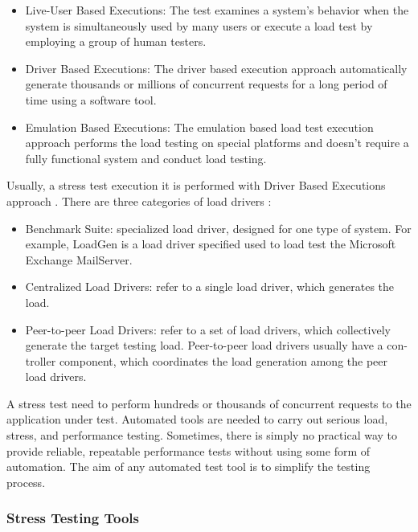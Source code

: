 \documentclass{report}
\begin{document}
\begin{itemize}
\item Live-User Based Executions: The test examines a system’s behavior when the system is simultaneously used by many users or execute a load test by employing a group of human testers.
\item Driver Based Executions: The driver based execution approach automatically generate thousands or millions of concurrent requests for a long period of time using a software tool.
\item Emulation Based Executions: The emulation based load test execution approach performs the load testing on special platforms and doesn't require a fully functional system and conduct load testing.
\end{itemize}

Usually, a stress test execution it is performed with Driver Based Executions approach \cite{Erinle2013} \cite{MohammadS.Obaidat} \cite{Wang2013}. There are three categories of load drivers \cite{Jiang2010}:

\begin{itemize}
\item Benchmark Suite: specialized load driver, designed for one type of system. For example, LoadGen is a load driver specified used to load test the Microsoft Exchange MailServer.
\item  Centralized Load Drivers: refer to a single load driver, which generates the load.
\item Peer-to-peer Load Drivers: refer to a set of load drivers, which collectively generate the target testing load. Peer-to-peer load drivers usually have a con- troller component, which coordinates the load generation among the peer load drivers.
\end{itemize}

A stress test need to perform hundreds or thousands of concurrent requests  to the application under test. Automated tools are needed to carry out serious load, stress, and performance testing. Sometimes, there is simply no practical way to provide reliable, repeatable performance tests without using some form of automation. The aim of any automated test tool is to simplify the testing process.


\subsubsection{Stress Testing Tools}
\end{document}
